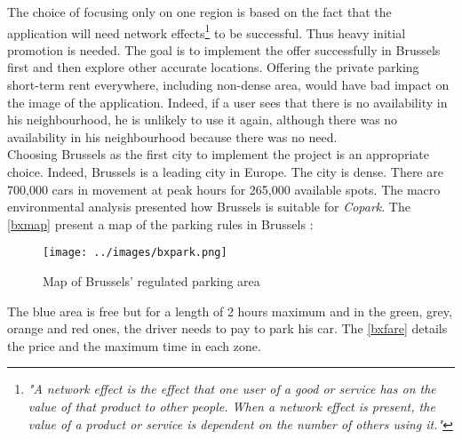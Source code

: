 \documentclass[12pt,a4paper,oneside]{book}
\newcommand{\bp}{\textit{Copark}}
\begin{document}
The choice of focusing only on one region is based on the fact that the application will need network effects\footnote{\textit{"A network effect is the effect that one user of a good or service has on the value of that product to other people. When a network effect is present, the value of a product or service is dependent on the number of others using it."}} to be successful. Thus heavy initial promotion is needed. The goal is to implement the offer successfully in Brussels first and then explore other accurate locations. Offering the private parking short-term rent everywhere, including non-dense area, would have bad impact on the image of the application. Indeed, if a user sees that there is no availability in his neighbourhood, he is unlikely to use it again, although there was no availability in his neighbourhood because there was no need.\\

Choosing Brussels as the first city to implement the project is an appropriate choice. Indeed, Brussels is a leading city in Europe. The city is dense. There are 700,000 cars in movement at peak hours for 265,000 available spots.\cite{parkbx} The macro environmental analysis presented how Brussels is suitable for \bp{}. The \autoref{bxmap} present a map of the parking rules in Brussels\cite{parkbx} : \\

\begin{figure}[h]
\centering
\caption{Map of Brussels' regulated parking area}
\label{bxmap}
\texttt{[image: ../images/bxpark.png]}
\end{figure}


The blue area is free but for a length of 2 hours maximum and in the green, grey, orange and red ones, the driver needs to pay to park his car. The \autoref{bxfare} details the price and the maximum time in each zone.\\
\end{document}
